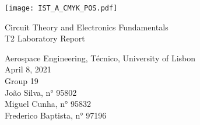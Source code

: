 
\thispagestyle {empty}

\texttt{[image: IST\_A\_CMYK\_POS.pdf]}

\begin{center}
%
\vspace{1.0cm}

\vspace{1cm}
{\FontLb Circuit Theory and Electronics Fundamentals} \\ %
\vspace{3cm}
{\FontSn T2 Laboratory Report} %
\vspace{3cm}
\par
{\FontSn Aerospace Engineering, Técnico, University of Lisbon} \\
\vspace{1cm}
{\FontSn April 8, 2021}\\ %
%
\vspace{1.5cm}
{\FontLb Group 19} \\
\vspace{1cm}
{\FontSn João Silva, n° 95802} \\
{\FontSn Miguel Cunha, n° 95832} \\
{\FontSn Frederico Baptista, n° 97196} \\
\end{center}

